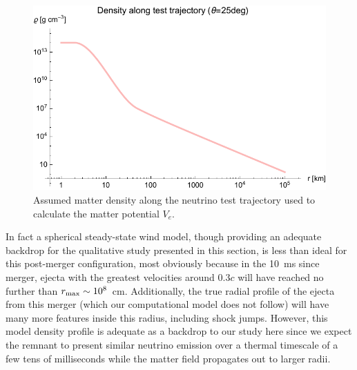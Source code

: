 \documentclass[aps,floatfix,prd,superscriptaddress,twocolumn]{revtex4-1}
\begin{document}
\begin{figure}
  \includegraphics[width=\columnwidth]{profile-density-000Mo-025deg}
  \caption{Assumed matter density along the neutrino test trajectory
    used to calculate the matter potential $V_e$.
    }
  \label{fig:test_traj_density}
\end{figure}

In fact a spherical steady-state wind model, though providing an adequate
backdrop for the qualitative study presented in this section,
is less than ideal for this post-merger configuration,
most obviously because in the 10~ms since merger,
ejecta with the greatest velocities around $0.3c$
will have reached no further than $r_{\rm max} \sim 10^8$~cm.
Additionally, the true radial profile of the ejecta from this merger
(which our computational model does not follow)
will have many more features inside this radius, including shock jumps.
However, this model density profile is adequate as a backdrop to our study here
since we expect the remnant to present similar neutrino emission over a thermal
timescale of a few tens of milliseconds
while the matter field propagates out to larger radii.
\end{document}
